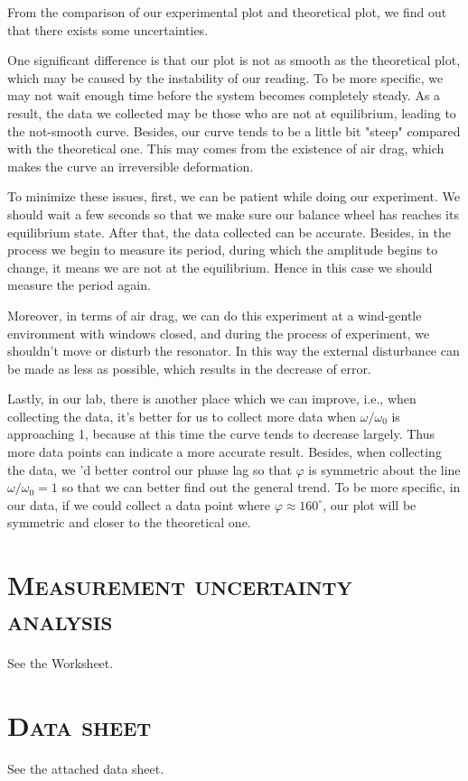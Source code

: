 \documentclass[a4paper,12pt]{article}
\begin{document}
\newpage
\par From the comparison of our experimental plot and theoretical plot, we find out that there exists some uncertainties. 
\par One significant difference is that our plot is not as smooth as the theoretical plot, which may be caused by the instability of our reading. To be more specific, we may not wait enough time before the system becomes completely steady. As a result, the data we collected may be those who are not at equilibrium, leading to the not-smooth curve. Besides, our curve tends to be a little bit "steep" compared with the theoretical one. This may comes from the existence of air drag, which makes the curve an irreversible deformation. 
\par To minimize these issues, first, we can be patient while doing our experiment. We should wait a few seconds so that we make sure our balance wheel has reaches its equilibrium state. After that, the data collected can be accurate. Besides, in the process we begin to measure its period, during which the amplitude begins to change, it means we are not at the equilibrium. Hence in this case we should measure the period again. 
\par Moreover, in terms of air drag, we can do this experiment at a wind-gentle environment with windows closed, and during the process of experiment, we shouldn't move or disturb the resonator. In this way the external disturbance can be made as less as possible, which results in the decrease of error.
\par Lastly, in our lab, there is another place which we can improve, i.e., when collecting the data, it's better for us to collect more data when $\omega/\omega_0$ is approaching 1, because at this time the curve tends to decrease largely. Thus more data points can indicate a more accurate result. Besides, when collecting the data, we 'd better control our phase lag so that $\varphi$ is symmetric about the line $\omega/\omega_0 = 1$ so that we can better find out the general trend. To be more specific, in our data, if we could collect a data point where $\varphi \approx 160^\circ$, our plot will be symmetric and closer to the theoretical one.


\begin{appendices} 
      \section{\textsc{Measurement uncertainty analysis}} 
      See the Worksheet.
      \section{\textsc{Data sheet}} 
      See the attached data sheet.
  \end{appendices} 
\end{document}
